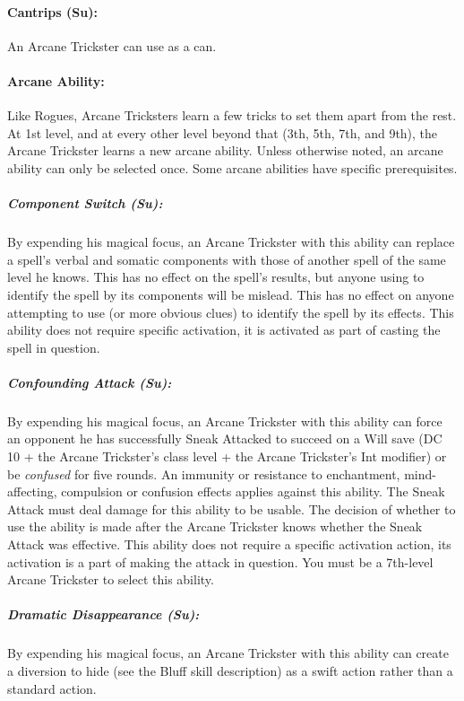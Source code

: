 \paragraph[Cantrips]{Cantrips (Su):} 
An Arcane Trickster can use  as a  can.

\paragraph{Arcane Ability:}
Like Rogues, Arcane Tricksters learn a few tricks to set them apart from the rest.
At 1st level, and at every other level beyond that (3th, 5th, 7th, and 9th), the Arcane Trickster learns a new arcane ability. Unless otherwise noted, an arcane ability can only be selected once. Some arcane abilities have specific prerequisites.

\subparagraph{Component Switch (Su):} By expending his magical focus, an Arcane Trickster with this ability can replace a spell's verbal and somatic components with those of another spell of the same level he knows. This has no effect on the spell's results, but anyone using  to identify the spell by its components will be mislead.
This has no effect on anyone attempting to use  (or more obvious clues) to identify the spell by its effects.
This ability does not require specific activation, it is activated as part of casting the spell in question.

\subparagraph{Confounding Attack (Su):} By expending his magical focus, an Arcane Trickster with this ability can force an opponent he has successfully Sneak Attacked to succeed on a Will save (DC 10 + the Arcane Trickster's class level + the Arcane Trickster's Int modifier) or be \emph{confused} for five rounds.
An immunity or resistance to enchantment, mind-affecting, compulsion or confusion effects applies against this ability.
The Sneak Attack must deal damage for this ability to be usable. The decision of whether to use the ability is made after the Arcane Trickster knows whether the Sneak Attack was effective.
This ability does not require a specific activation action, its activation is a part of making the attack in question.
You must be a 7th-level Arcane Trickster to select this ability.

\subparagraph{Dramatic Disappearance (Su):} By expending his magical focus, an Arcane Trickster with this ability can create a diversion to hide (see the Bluff skill description) as a swift action rather than a standard action.


